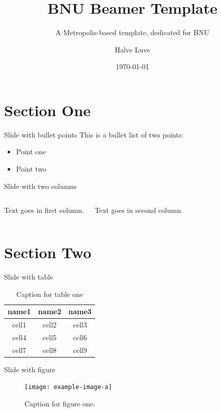 \documentclass{beamer}
\title{BNU Beamer Template}
\subtitle{A Metropolis-based template, dedicated for BNU}
\date{\today}
\author{Halve Luve}
\institute{School of Artificial Intelligence, Beijing Normal University}
\begin{document}
    \maketitle
    \tableofcontents

    \section{Section One}
    \begin{frame}{Slide with bullet points}
        This is a bullet list of two points:
        \begin{itemize}
            \item Point one
            \item Point two
        \end{itemize}
    \end{frame}

    \begin{frame}{Slide with two columns}
        \begin{columns}
            Text goes in first column.
            
            Text goes in second column
        \end{columns}
    \end{frame}

    \section{Section Two}

    \begin{frame}{Slide with table}
        \begin{table}
            \centering
            \begin{tabular}{ccc}
                \hline
                \textbf{name1} & \textbf{name2} & \textbf{name3} \\
                \hline 
                cell1 & cell2 & cell3 \\ 
                cell4 & cell5 & cell6 \\ 
                cell7 & cell8 & cell9 \\ 
                \hline
            \end{tabular}
            \caption{Caption for table one}
            \label{tab:table1}
        \end{table}
    \end{frame}

    \begin{frame}{Slide with figure}
        \begin{figure}[H]
            \centering
            \texttt{[image: example-image-a]}
            \caption{Caption for figure one.}
            \label{fig:figure1}
        \end{figure}
    \end{frame}
\end{document}
